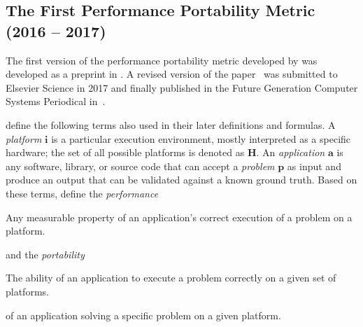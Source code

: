 \subsection{The First Performance Portability Metric \pp (2016 -- 2017)}
\label{sec:first_pp_metric}


The first version of the performance portability metric developed by \citet{pennycook_metric_2016} was developed as a preprint in \citeyear{pennycook_metric_2016}. 
A revised version of the paper~\cite{pennycook_implications_2019} was submitted to Elsevier Science in 2017 and finally published in the Future Generation Computer Systems Periodical in~\citeyear{pennycook_implications_2019}. 

\citeauthor{pennycook_implications_2019} define the following terms also used in their later definitions and formulas. 
A \textit{platform} $\mathbf{i}$ is a particular execution environment, mostly interpreted as a specific hardware; the set of all possible platforms is denoted as $\mathbf{H}$. 
An \textit{application} $\mathbf{a}$ is any software, library, or source code that can accept a \textit{problem} $\mathbf{p}$ as input and produce an output that can be validated against a known ground truth. 
Based on these terms, \citeauthor{pennycook_implications_2019} define the \textit{performance}  
\begin{quotebox}{\citet{pennycook_implications_2019}}
    Any measurable property of an application’s correct execution of a problem on a platform.
\end{quotebox}
and the \textit{portability} 
\begin{quotebox}{\citet{pennycook_implications_2019}}
    The ability of an application to execute a problem correctly on a given set of platforms.
\end{quotebox}
of an application solving a specific problem on a given platform. 

